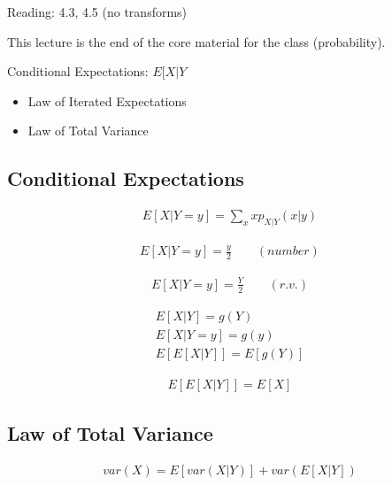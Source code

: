 

Reading: 4.3, 4.5 (no transforms)

This lecture is the end of the core material for the class (probability).

Conditional Expectations: $E[X|Y$
\begin{itemize}
    \item Law of Iterated Expectations
    \item Law of Total Variance
\end{itemize}

\subsection{Conditional Expectations}


\begin{align*}
    E[X|Y=y]= \sum_x x p_{X|Y}(x|y)
\end{align*}

\begin{align*}
    E[X|Y=y]=\frac{y}{2} \qquad (number)
\end{align*}

\begin{align*}
    E[X|Y=y]=\frac{Y}{2} \qquad (r.v.)
\end{align*}


\begin{align*}
    E[X|Y]=g(Y)\\
    E[X|Y=y]=g(y)\\
    E[E[X|Y]]=E[g(Y)]
\end{align*}

\begin{align*}
E[E[X|Y]]=E[X]
\end{align*}

\subsection{Law of Total Variance}

\begin{align*}
var(X) = E[var(X|Y)] + var(E[X|Y])
\end{align*}

